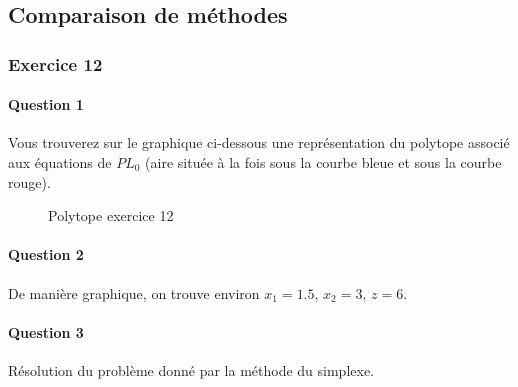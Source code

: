 \documentclass[a4paper, 12pt]{article}
\begin{document}
\subsection{Comparaison de méthodes}

\subsubsection*{Exercice 12}

\paragraph{Question 1}

Vous trouverez sur le graphique ci-dessous une représentation du
polytope associé aux équations de $PL_0$ (aire située à la fois sous la courbe
bleue et sous la courbe rouge).

\begin{figure}[h!]
\centering
{}
\caption{Polytope exercice 12}
\end{figure}

\paragraph{Question 2}
De manière graphique, on trouve environ $x_1 = 1.5$, $x_2 = 3$, $z = 6$.

\paragraph{Question 3}

Résolution du problème donné par la méthode du simplexe.
\end{document}

